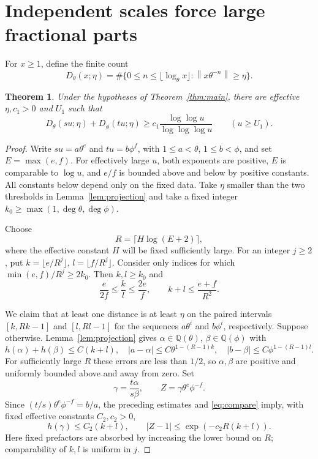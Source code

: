 \documentclass[11pt]{article}
\newtheorem{theorem}{Theorem}
\newcommand{\Q}{\mathbb Q}
\newcommand{\dist}[1]{\left\|#1\right\|}
\begin{document}
\section{Independent scales force large fractional parts}
For $x\geq1$, define the finite count
\[
 D_\theta(x;\eta)=\#\{0\leq n\leq\lfloor\log_\theta x\rfloor:
                           \dist{x\theta^{-n}}\geq\eta\}.
\]
\begin{theorem}\label{thm:count}
Under the hypotheses of Theorem~\ref{thm:main}, there are effective
$\eta,c_1>0$ and $U_1$ such that
\begin{equation}\label{eq:count}
 D_\theta(su;\eta)+D_\phi(tu;\eta)
 \geq c_1\frac{\log\log u}{\log\log\log u}\qquad(u\geq U_1).
\end{equation}
\end{theorem}
\begin{proof}
Write $su=a\theta^e$ and $tu=b\phi^f$, with
$1\leq a<\theta$, $1\leq b<\phi$, and set $E=\max(e,f)$.
For effectively large $u$, both exponents are positive,
$E$ is comparable to $\log u$, and $e/f$ is bounded above and below
by positive constants. All constants below depend only on the fixed data.
Take $\eta$ smaller than the two thresholds in
Lemma~\ref{lem:projection} and take a fixed integer
$k_0\geq\max(1,\deg\theta,\deg\phi)$.

Choose
\[
 R=\lceil H\log(E+2)\rceil,
\]
where the effective constant $H$ will be fixed sufficiently large.
For an integer $j\geq2$, put
$k=\lfloor e/R^j\rfloor$, $l=\lfloor f/R^j\rfloor$.
Consider only indices for which $\min(e,f)/R^j\geq2k_0$.
Then $k,l\geq k_0$ and
\begin{equation}\label{eq:compare}
 \frac{e}{2f}\leq\frac{k}{l}\leq\frac{2e}{f},\qquad
 k+l\leq\frac{e+f}{R^2}.
\end{equation}

We claim that at least one distance is at least $\eta$ on the paired
intervals $[k,Rk-1]$ and $[l,Rl-1]$ for the sequences
$a\theta^i$ and $b\phi^i$, respectively. Suppose otherwise.
Lemma~\ref{lem:projection} gives $\alpha\in\Q(\theta)$,
$\beta\in\Q(\phi)$ with
\[
 h(\alpha)+h(\beta)\leq C(k+l),\quad
 |a-\alpha|\leq C\theta^{1-(R-1)k},\quad
 |b-\beta|\leq C\phi^{1-(R-1)l}.
\]
For sufficiently large $R$ these errors are less than $1/2$, so
$\alpha,\beta$ are positive and uniformly bounded above and away from zero.
Set
\[
 \gamma=\frac{t\alpha}{s\beta},\qquad
 Z=\gamma\theta^e\phi^{-f}.
\]
Since $(t/s)\theta^e\phi^{-f}=b/a$, the preceding estimates and
\eqref{eq:compare} imply, with fixed effective constants $C_2,c_2>0$,
\begin{equation}\label{eq:Z}
 h(\gamma)\leq C_2(k+l),\qquad
 |Z-1|\leq\exp(-c_2R(k+l)).
\end{equation}
Here fixed prefactors are absorbed by increasing the lower bound on $R$;
comparability of $k,l$ is uniform in $j$.


\end{proof}
\end{document}

